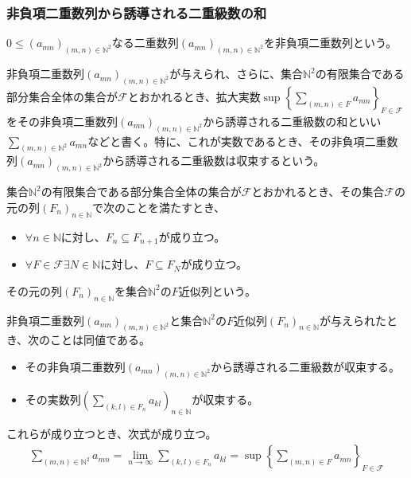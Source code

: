 \documentclass[dvipdfmx]{jsarticle}
\begin{document}
\subsubsection{非負項二重数列から誘導される二重級数の和}%
\begin{dfn}
$0 \leq \left( a_{mn} \right)_{(m,n) \in \mathbb{N}^{2}}$なる二重数列$\left( a_{mn} \right)_{(m,n) \in \mathbb{N}^{2}}$を非負項二重数列という。
\end{dfn}
\begin{dfn}
非負項二重数列$\left( a_{mn} \right)_{(m,n) \in \mathbb{N}^{2}}$が与えられ、さらに、集合$\mathbb{N}^{2}$の有限集合である部分集合全体の集合が$\mathcal{F}$とおかれるとき、拡大実数$\sup\left\{ \sum_{(m,n) \in F}a_{mn} \right\}_{F \in \mathcal{F}}$をその非負項二重数列$\left( a_{mn} \right)_{(m,n) \in \mathbb{N}^{2}}$から誘導される二重級数の和といい$\sum_{(m,n) \in \mathbb{N}^{2}}a_{mn}$などと書く。特に、これが実数であるとき、その非負項二重数列$\left( a_{mn} \right)_{(m,n) \in \mathbb{N}^{2}}$から誘導される二重級数は収束するという。
\end{dfn}
\begin{dfn}
集合$\mathbb{N}^{2}$の有限集合である部分集合全体の集合が$\mathcal{F}$とおかれるとき、その集合$\mathcal{F}$の元の列$\left( F_{n} \right)_{n \in \mathbb{N}}$で次のことを満たすとき、
\begin{itemize}
\item
  $\forall n \in \mathbb{N}$に対し、$F_{n} \subseteq F_{n + 1}$が成り立つ。
\item
  $\forall F \in \mathcal{F}\exists N \in \mathbb{N}$に対し、$F \subseteq F_{N}$が成り立つ。
\end{itemize}
その元の列$\left( F_{n} \right)_{n \in \mathbb{N}}$を集合$\mathbb{N}^{2}$の$F$近似列という。
\end{dfn}
\begin{thm}\label{4.1.9.1}
非負項二重数列$\left( a_{mn} \right)_{(m,n) \in \mathbb{N}^{2}}$と集合$\mathbb{N}^{2}$の$F$近似列$\left( F_{n} \right)_{n \in \mathbb{N}}$が与えられたとき、次のことは同値である。
\begin{itemize}
\item
  その非負項二重数列$\left( a_{mn} \right)_{(m,n) \in \mathbb{N}^{2}}$から誘導される二重級数が収束する。
\item
  その実数列$\left( \sum_{(k,l) \in F_{n}}a_{kl} \right)_{n \in \mathbb{N}}$が収束する。
\end{itemize}
これらが成り立つとき、次式が成り立つ。
\begin{align*}
\sum_{(m,n) \in \mathbb{N}^{2}}a_{mn} = \lim_{n \rightarrow \infty}{\sum_{(k,l) \in F_{n}}a_{kl}} = \sup\left\{ \sum_{(m,n) \in F}a_{mn} \right\}_{F \in \mathcal{F}}
\end{align*}
\end{thm}
\end{document}
